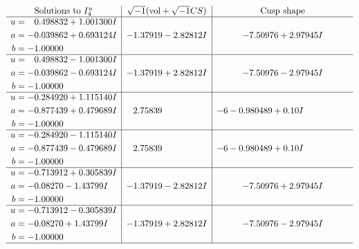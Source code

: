 \documentclass[1p]{elsarticle_modified}
\theoremstyle{definition}
\newcommand{\I}{\sqrt{-1}}
\begin{document}
$$\begin{array}{c|c|c}  
\text{Solutions to }I^u_{4}& \I (\text{vol} + \sqrt{-1}CS) & \text{Cusp shape}\\
 \hline 
\begin{aligned}
u &= \phantom{-}0.498832 + 1.001300 I \\
a &= -0.039862 + 0.693124 I \\
b &= -1.00000\phantom{ +0.000000I}\end{aligned}
 & -1.37919 - 2.82812 I & -7.50976 + 2.97945 I \\ \hline\begin{aligned}
u &= \phantom{-}0.498832 - 1.001300 I \\
a &= -0.039862 - 0.693124 I \\
b &= -1.00000\phantom{ +0.000000I}\end{aligned}
 & -1.37919 + 2.82812 I & -7.50976 - 2.97945 I \\ \hline\begin{aligned}
u &= -0.284920 + 1.115140 I \\
a &= -0.877439 + 0.479689 I \\
b &= -1.00000\phantom{ +0.000000I}\end{aligned}
 & \phantom{-}2.75839\phantom{ +0.000000I} &                  -6
-0.980489 + 0. 10   I\phantom{ +0.000000I} \\ \hline\begin{aligned}
u &= -0.284920 - 1.115140 I \\
a &= -0.877439 - 0.479689 I \\
b &= -1.00000\phantom{ +0.000000I}\end{aligned}
 & \phantom{-}2.75839\phantom{ +0.000000I} &                  -6
-0.980489 + 0. 10   I\phantom{ +0.000000I} \\ \hline\begin{aligned}
u &= -0.713912 + 0.305839 I \\
a &= -0.08270 - 1.43799 I \\
b &= -1.00000\phantom{ +0.000000I}\end{aligned}
 & -1.37919 - 2.82812 I & -7.50976 + 2.97945 I \\ \hline\begin{aligned}
u &= -0.713912 - 0.305839 I \\
a &= -0.08270 + 1.43799 I \\
b &= -1.00000\phantom{ +0.000000I}\end{aligned}
 & -1.37919 + 2.82812 I & -7.50976 - 2.97945 I\\
 \hline 
 \end{array}$$\newpage\newpage\renewcommand{\arraystretch}{1}
\end{document}
